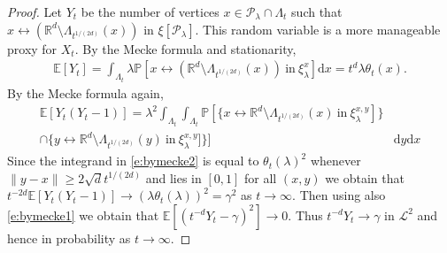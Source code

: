\documentclass[a4paper,12pt]{scrartcl}
\renewcommand{\d}{\mathrm{d}}
\theoremstyle{definition}
\theoremstyle{remark}
\begin{document}
\begin{proof}
    Let $Y_t$ be the number of vertices $x \in \mathcal P_\lambda
    \cap \Lambda_t$
    such that $x \leftrightarrow (\mathbb R^d \setminus \Lambda_{t^{1/(2d)}}
    (x) )$ in
    $\xi[\mathcal P_\lambda ]$.
    This random variable is a more manageable proxy
    for $X_t$. By the Mecke formula and stationarity,
    \begin{align}
      \mathbb E[ Y_t] =  \int_{\Lambda_t}
      \lambda \mathbb P[
        x \leftrightarrow (\mathbb R^d \setminus
      \Lambda_{t^{1/(2d)}}(x)) ~ \mathrm{in} ~ \xi_\lambda^x]
      \d x  = t^d  \lambda \theta_t(x).
      \label{e:bymecke1}
    \end{align}
    By the Mecke formula again,
    \begin{align}
      \mathbb E[Y_t(Y_t -1)] =
      \lambda^2 \int_{\Lambda_t} \int_{\Lambda_t}
      \mathbb P[
        \{x \leftrightarrow \mathbb R^d \setminus
        \Lambda_{t^{1/(2d)}}(x) ~ \mathrm{in} ~ \xi_\lambda^{x,y}]
      \}
      &
      \\
      \cap \{ y \leftrightarrow \mathbb R^d \setminus
        \Lambda_{t^{1/(2d)}}(y) ~ \mathrm{in} ~ \xi_\lambda^{x,y}
  ] \}] &
  \d y \d x
  \label{e:bymecke2}
\end{align}
Since
the integrand in \eqref{e:bymecke2}
is equal to $\theta_t(\lambda)^2$ whenever $\| y-x \| \geq
2 \sqrt{d} t^{1/(2d)}$ and lies in $[0,1]$ for all $(x,y)$ we obtain that
$
t^{-2d}  \mathbb E[Y_t(Y_t -1)] \to  (\lambda \theta_t(\lambda))^2
= \gamma^2 $
as $t \to \infty$.
Then using also \eqref{e:bymecke1}   we obtain that
$
\mathbb E[(t^{-d} Y_t - \gamma %
)^2] \to 0.
$
Thus $t^{-d} Y_t \to \gamma $
in ${\mathcal L}^2$ and hence in probability as $t \to \infty$.


\end{proof}
\end{document}
